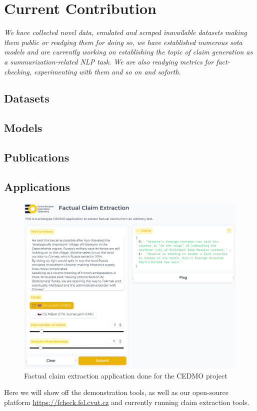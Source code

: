 
\chapter{Current Contribution}
\label{chap:contribution}

\textit{We have collected novel data, emulated and scraped inavailable datasets making them public or readying them for doing so, we have established numerous sota models and are currently working on establishing the topic of claim generation as a summarization-related NLP task.
We are also readying metrics for fact-checking, experimenting with them and so on and soforth.}

\section{Datasets}
\label{sec:pretrain}
\section{Models}
\label{sec:models}
\section{Publications}
\label{sec:models}
\section{Applications}
\label{sec:models}

\begin{figure}
    \includegraphics[width=16cm]{fig/cedmo.pdf}
    \caption{Factual claim extraction application done for the CEDMO project}
    \label{fig:framework}
\end{figure}

Here we will show off the demonstration tools, as well as our open-source platform \url{https://fcheck.fel.cvut.cz} and currently running claim extraction tools. 